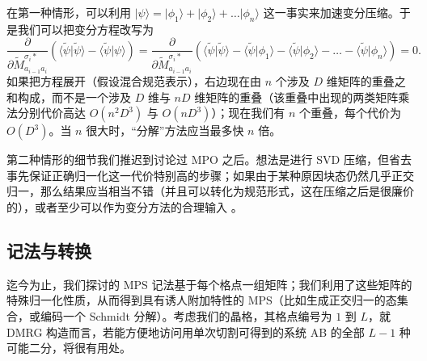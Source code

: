 \documentclass[a4paper,10pt,oneside,onecolumn,1p,times]{elsarticle}
\newcommand{\ket}[1]{\mbox{$| #1  \rangle$}}
\newcommand{\braket}[2]{\mbox{$\langle #1  | #2 \rangle$}} 	%
\begin{document}
在第一种情形，可以利用 $\ket{\psi} = \ket{\phi_1} + \ket{\phi_2} + \ldots \ket{\phi_n}$ 这一事实来加速变分压缩。于是我们可以把变分方程改写为
\begin{equation}
 \frac{\partial}{\partial \tilde{M}^{\sigma_i*}_{a_{i-1}a_i}} ( \braket{\tilde{\psi}}{\tilde{\psi}}
- \braket{\tilde{\psi}}{\psi} ) =  \frac{\partial}{\partial \tilde{M}^{\sigma_i*}_{a_{i-1}a_i}} ( \braket{\tilde{\psi}}{\tilde{\psi}} - \braket{\tilde{\psi}}{\phi_1}
- \braket{\tilde{\psi}}{\phi_2} - \ldots - \braket{\tilde{\psi}}{\phi_n}) = 0 .
\end{equation}
如果把方程展开（假设混合规范表示），右边现在由 $n$ 个涉及 $D$ 维矩阵的重叠之和构成，而不是一个涉及 $D$ 维与 $nD$ 维矩阵的重叠（该重叠中出现的两类矩阵乘法分别代价高达 $O(n^2D^3)$ 与 $O(nD^3)$）；现在我们有 $n$ 个重叠，每个代价为 $O(D^3)$。当 $n$ 很大时，``分解''方法应当最多快 $n$ 倍。

第二种情形的细节我们推迟到讨论过 MPO 之后。想法是进行 SVD 压缩，但省去事先保证正确归一化这一代价特别高的步骤；如果由于某种原因块态仍然几乎正交归一，那么结果应当相当不错（并且可以转化为规范形式，这在压缩之后是很廉价的），或者至少可以作为变分方法的合理输入 \cite{Stoudenmire10}。

\subsection{记法与转换}
迄今为止，我们探讨的 MPS 记法基于每个格点一组矩阵；我们利用了这些矩阵的特殊归一化性质，从而得到具有诱人附加特性的 MPS（比如生成正交归一的态集合，或编码一个 Schmidt 分解）。考虑我们的晶格，其格点编号为 $1$ 到 $L$，就 DMRG 构造而言，若能方便地访问用单次切割可得到的系统 AB 的全部 $L-1$ 种可能二分，将很有用处。
\end{document}
